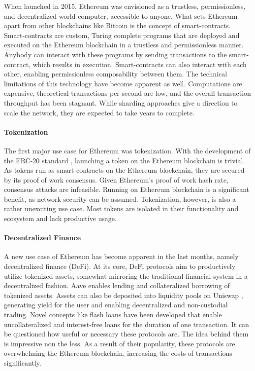 \documentclass[../../thesis.tex]{subfiles}
\begin{document}
When launched in 2015, Ethereum \cite{wood2014ethereum} was envisioned as a trustless, permissionless, and decentralized world computer, accessible to anyone. What sets Ethereum apart from other blockchains like Bitcoin \cite{nakamoto2009bitcoin} is the concept of smart-contracts. Smart-contracts are custom, Turing complete programs that are deployed and executed on the Ethereum blockchain in a trustless and permissionless manner. Anybody can interact with these programs by sending transactions to the smart-contract, which results in execution. Smart-contracts can also interact with each other, enabling permissionless composability between them. The technical limitations of this technology have become apparent as well. Computations are expensive, theoretical transactions per second are low, and the overall transaction throughput has been stagnant. While sharding approaches give a direction to scale the network, they are expected to take years to complete. 

\paragraph{Tokenization}
The first major use case for Ethereum was tokenization. With the development of the ERC-20 standard \cite{erc20}, launching a token on the Ethereum blockchain is trivial. As tokens run as smart-contracts on the Ethereum blockchain, they are secured by its proof of work consensus. Given Ethereum's proof of work hash rate, consensus attacks are infeasible. Running on Ethereum blockchain is a significant benefit, as network security can be assumed. Tokenization, however, is also a rather unexciting use case. Most tokens are isolated in their functionality and ecosystem and lack productive usage. 

\paragraph{Decentralized Finance}
A new use case of Ethereum has become apparent in the last months, namely decentralized finance (DeFi). At its core, DeFi protocols aim to productively utilize tokenized assets, somewhat mirroring the traditional financial system in a decentralized fashion. Aave \cite{kulechov_2020} enables lending and collateralized borrowing of tokenized assets. Assets can also be deposited into liquidity pools on Uniswap \cite{adams2020uniswap}, generating yield for the user and enabling decentralized and non-custodial trading. Novel concepts like flash loans have been developed that enable uncollateralized and interest-free loans for the duration of one transaction. It can be questioned how useful or necessary these protocols are. The idea behind them is impressive non the less. As a result of their popularity, these protocols are overwhelming the Ethereum blockchain, increasing the costs of transactions significantly. 
\end{document}
